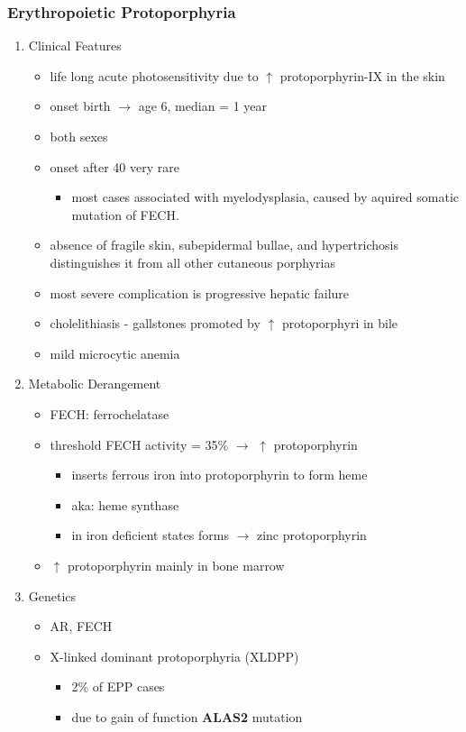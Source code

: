 \documentclass{scrartcl}
\begin{document}
\subsubsection{Erythropoietic Protoporphyria}
\label{sec:orga402228}
\begin{enumerate}
\item Clinical Features
\label{sec:orgc646a91}
\begin{itemize}
\item life long acute photosensitivity due to \(\uparrow\) protoporphyrin-IX
in the skin
\item onset birth \(\to\) age 6, median = 1 year
\item both sexes
\item onset after 40 very rare
\begin{itemize}
\item most cases associated with myelodysplasia, caused by aquired
somatic mutation of FECH.
\end{itemize}
\item absence of fragile skin, subepidermal bullae, and hypertrichosis
distinguishes it from all other cutaneous porphyrias
\item most severe complication is progressive hepatic failure
\item cholelithiasis - gallstones promoted by \(\uparrow\) protoporphyri in bile
\item mild microcytic anemia
\end{itemize}

\item Metabolic Derangement
\label{sec:orgaa6c41a}
\begin{itemize}
\item FECH: ferrochelatase
\item threshold FECH activity = 35\% \(\to\) \(\uparrow\) protoporphyrin
\begin{itemize}
\item inserts ferrous iron into protoporphyrin to form heme
\item aka: heme synthase
\item in iron deficient states forms \(\to\) zinc protoporphyrin
\end{itemize}
\item \(\uparrow\) protoporphyrin mainly in bone marrow
\end{itemize}

\item Genetics
\label{sec:orgfc08873}
\begin{itemize}
\item AR, FECH
\item X-linked dominant protoporphyria (XLDPP)
\begin{itemize}
\item 2\% of EPP cases
\item due to gain of function \textbf{ALAS2} mutation
\end{itemize}
\end{itemize}


\end{enumerate}
\end{document}
